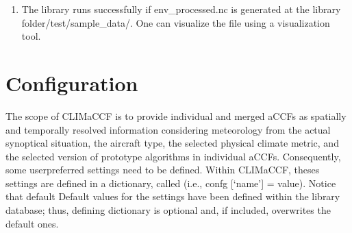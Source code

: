 \documentclass[a4paper,11pt,english]{sphinxmanual}
\begin{document}
\begin{sphinxVerbatim}[commandchars=\\\{\}]
  
\end{sphinxVerbatim}
\begin{enumerate}
%
\setcounter{enumi}{3}
\item {} 
The library runs successfully if env\_processed.nc is generated at the library folder/test/sample\_data/. One can visualize the file using a visualization tool.

\end{enumerate}


\section{Configuration}
\label{\detokenize{gStarted:configuration}}
The scope of CLIMaCCF is to provide individual and merged aCCFs as spatially and temporally resolved information considering meteorology from the actual synoptical situation, the aircraft type, the selected physical climate metric, and the selected version of prototype algorithms in individual aCCFs. Consequently, some user\sphinxhyphen{}preferred settings need to
be defined. Within CLIMaCCF, theses settings are defined in a dictionary, called  (i.e., confg {[}‘name’{]} = value). Notice that default
Default values for the settings have been defined within the library database; thus, defining dictionary  is optional and, if included, overwrites the default ones.
\end{document}
